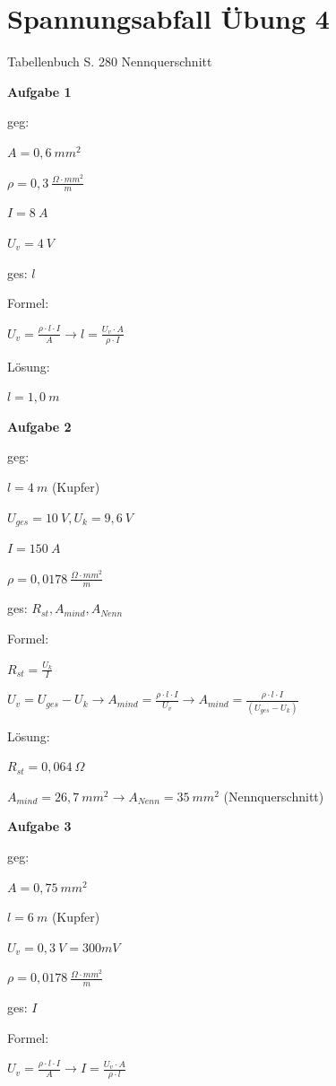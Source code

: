 \section{Spannungsabfall Übung 4}\label{spannungsabfall-uebung-4}

Tabellenbuch S. 280 Nennquerschnitt

\textbf{Aufgabe 1}

geg:

$A = 0,6~mm^2$

$\rho = 0,3~\frac{\Omega \cdot mm^2}{m}$

$I = 8~A$

$U_v = 4~V$

ges: $l$

Formel:

$U_v = \frac{\rho \cdot l \cdot I}{A} \to l = \frac{U_v \cdot A}{\rho \cdot I}$

Lösung:

$l = 1,0~m$

\textbf{Aufgabe 2}

geg:

$l = 4~m$ (Kupfer)

$U_{ges} = 10~V, U_k = 9,6~V$

$I = 150~A$

$\rho = 0,0178~\frac{\Omega \cdot mm^2}{m}$

ges: $R_{st}, A_{mind}, A_{Nenn}$

Formel:

$R_{st} = \frac{U_k}{I}$

$U_v = U_{ges} - U_k \to A_{mind} = \frac{\rho \cdot l \cdot I}{U_v} \to A_{mind} = \frac{\rho \cdot l \cdot I}{(U_{ges} - U_k)}$

Lösung:

$R_{st} = 0,064~\Omega$

$A_{mind} = 26,7~mm^2 \to A_{Nenn} = 35~mm^2$ (Nennquerschnitt)

\newpage

\textbf{Aufgabe 3}

geg:

$A = 0,75~mm^2$

$l = 6~m$ (Kupfer)

$U_v = 0,3~V = 300 mV$

$\rho = 0,0178~\frac{\Omega \cdot mm^2}{m}$

ges: $I$

Formel:

$U_v = \frac{\rho \cdot l \cdot I}{A} \to I = \frac{U_v \cdot A}{\rho \cdot l}$

